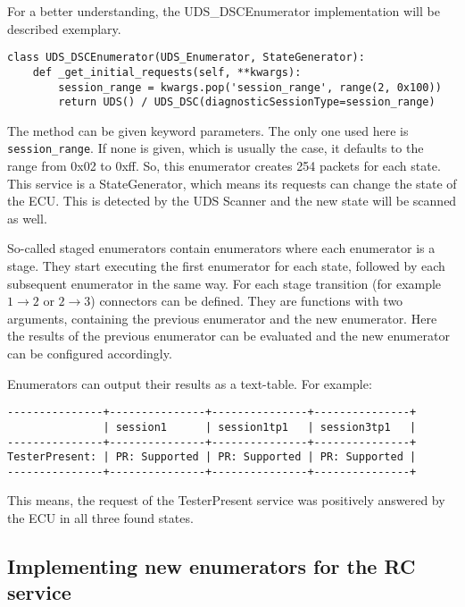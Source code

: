 For a better understanding, the UDS\_DSCEnumerator implementation will be described exemplary.

\begin{samepage}
\begin{verbatim}
class UDS_DSCEnumerator(UDS_Enumerator, StateGenerator):
    def _get_initial_requests(self, **kwargs):
        session_range = kwargs.pop('session_range', range(2, 0x100))
        return UDS() / UDS_DSC(diagnosticSessionType=session_range)
\end{verbatim}
\end{samepage}

The method can be given keyword parameters. The only one used here is \texttt{session_range}. If none is given, which is usually the case, it defaults to the range from 0x02 to 0xff. So, this enumerator creates 254 packets for each state. This service is a StateGenerator, which means its requests can change the state of the ECU. This is detected by the UDS Scanner and the new state will be scanned as well.

So-called staged enumerators contain enumerators where each enumerator is a stage. They start executing the first enumerator for each state, followed by each subsequent enumerator in the same way. For each stage transition (for example $1 \rightarrow 2$ or $2 \rightarrow 3$) connectors can be defined. They are functions with two arguments, containing the previous enumerator and the new enumerator. Here the results of the previous enumerator can be evaluated and the new enumerator can be configured accordingly.

Enumerators can output their results as a text-table. For example:

\begin{samepage}
\begin{verbatim}
---------------+---------------+---------------+---------------+
               | session1      | session1tp1   | session3tp1   | 
---------------+---------------+---------------+---------------+
TesterPresent: | PR: Supported | PR: Supported | PR: Supported | 
---------------+---------------+---------------+---------------+
\end{verbatim}
\end{samepage}

This means, the request of the TesterPresent service was positively answered by the ECU in all three found states.

\subsection{Implementing new enumerators for the RC service}

